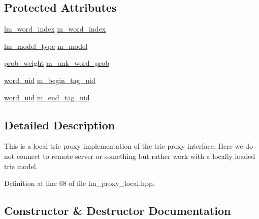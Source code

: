 \subsection*{Protected Attributes}
\begin{DoxyCompactItemize}
\item 
\hyperlink{namespaceuva_1_1smt_1_1bpbd_1_1server_1_1lm_a023e38a6fe02511f8c3c806784c2a5f2}{lm\+\_\+word\+\_\+index} \hyperlink{classuva_1_1smt_1_1bpbd_1_1server_1_1lm_1_1proxy_1_1lm__proxy__local_a52e51098548cbedd08af9b5b6fc897c8}{m\+\_\+word\+\_\+index}
\item 
\hyperlink{namespaceuva_1_1smt_1_1bpbd_1_1server_1_1lm_a1d312807a76856e10bfbed1cae210b0d}{lm\+\_\+model\+\_\+type} \hyperlink{classuva_1_1smt_1_1bpbd_1_1server_1_1lm_1_1proxy_1_1lm__proxy__local_ac9984821921672cd3ee113005d5412dd}{m\+\_\+model}
\item 
\hyperlink{namespaceuva_1_1smt_1_1bpbd_1_1server_a01e9ea4de9c226f4464862e84ff0bbcc}{prob\+\_\+weight} \hyperlink{classuva_1_1smt_1_1bpbd_1_1server_1_1lm_1_1proxy_1_1lm__proxy__local_a429b9054d6edfc673d541cb957b52690}{m\+\_\+unk\+\_\+word\+\_\+prob}
\item 
\hyperlink{namespaceuva_1_1smt_1_1bpbd_1_1server_a6bfe45ba344d65a7fdd7d26156328ddc}{word\+\_\+uid} \hyperlink{classuva_1_1smt_1_1bpbd_1_1server_1_1lm_1_1proxy_1_1lm__proxy__local_adf9f94e10e1d210e35c7716b08b89977}{m\+\_\+begin\+\_\+tag\+\_\+uid}
\item 
\hyperlink{namespaceuva_1_1smt_1_1bpbd_1_1server_a6bfe45ba344d65a7fdd7d26156328ddc}{word\+\_\+uid} \hyperlink{classuva_1_1smt_1_1bpbd_1_1server_1_1lm_1_1proxy_1_1lm__proxy__local_a656493c20699367286febb880cbf1ca1}{m\+\_\+end\+\_\+tag\+\_\+uid}
\end{DoxyCompactItemize}


\subsection{Detailed Description}
This is a local trie proxy implementation of the trie proxy interface. Here we do not connect to remote server or something but rather work with a locally loaded trie model. 

Definition at line 68 of file lm\+\_\+proxy\+\_\+local.\+hpp.



\subsection{Constructor \& Destructor Documentation}
\hypertarget{classuva_1_1smt_1_1bpbd_1_1server_1_1lm_1_1proxy_1_1lm__proxy__local_a1aa62dbdb57c77b3014169b4b9c5c215}{}
